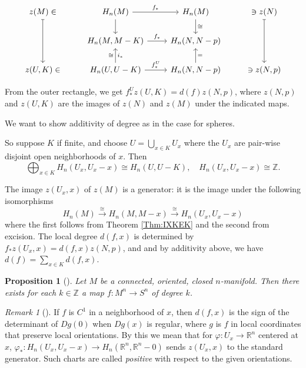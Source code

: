 \documentclass[reqno]{amsart}
\newtheorem{proposition}[theorem]{Proposition}
\theoremstyle{definition}
\theoremstyle{remark}
\newtheorem*{remark}{Remark}
\begin{document}
\begin{equation*}
\begin{tikzcd}
    z(M) \ar[dd, mapsto] 
    \in & H_n(M) \ar[r, "f_*"] \ar[d] & H_n(M) \ar[d, "\cong"]
        & \ni z(N) \ar[dd, mapsto] \\
             & H_n(M, M-K) \ar[r, "f_*"] & H_n(N, N-p) &\\
    z(U,K) \in & H_n(U, U-K) \ar[u, "\cong", "i_*"']
    \ar[r, "f_*^{U}"] &
    H_n(N, N-p) \ar[u, "="'] & \ni z(N,p)
\end{tikzcd}
\end{equation*}

From the outer rectangle, we get $f_*^{U} z(U,K) = d(f) z(N,p)$, where
$z(N,p)$ and $z(U,K)$ are the images of
$z(N)$ and $z(M)$ under the indicated maps.

We want to show additivity of degree as in the case for
spheres.

So suppose $K$ if finite, and choose
$U = \bigcup_{x \in K}  U_x$ where the $U_x$ are pair-wise
disjoint open neighborhoods of $x$. Then
\[
\bigoplus_{x \in K} H_n(U_x, U_x - x) \cong
H_n (U, U-K), \quad H_n (U_x, U_x - x) \cong \mathbb{Z}.
\] 

The image $z \left( U_x, x \right) $ of $z(M)$ is a generator:
it is the image under the following isomorphisms
\[
H_n (M) \stackrel{\cong}{\to} H_n (M, M- x) \stackrel{\cong}{\to}  
H_n (U_x, U_x -x)
\] 
where the first follows from Theorem 
\ref{Thm:IXKEK} and the second from
excision. The local degree 
$d(f,x)$ is determined by
$f_* z\left( U_x, x \right) = d(f,x) z(N,p)$, and
and by additivity above, we have
$d(f) = \sum_{x \in K} d(f,x)$.

\begin{proposition}[]
    Let $M$ be a connected, oriented, closed $n$-manifold.
    Then there exists for each $k \in \mathbb{Z}$ a map
    $f \colon M^{n} \to S^{n}$ of degree $k$.
\end{proposition}

\begin{remark}[]
    If $f$ is $C^{1}$ in a neighborhood of $x$, then
    $d(f,x)$ is the sign of the determinant of
    $D g(0)$ when $Dg(x)$ is regular, where
    $g$ is $f$ in local coordinates that preserve local orientations.
    By this we mean that for
    $\varphi  \colon U_x \to \mathbb{R}^{n}$ centered
    at $x$, $\varphi_* \colon
    H_n \left( U_x, U_x -x \right)  \to 
    H_n \left( \mathbb{R}^{n}, \mathbb{R}^{n} -0 \right) $ sends
    $z \left( U_x, x \right) $ to the standard generator.
    Such charts are called \textit{positive} with respect
    to the given orientations.
\end{remark}
\end{document}
